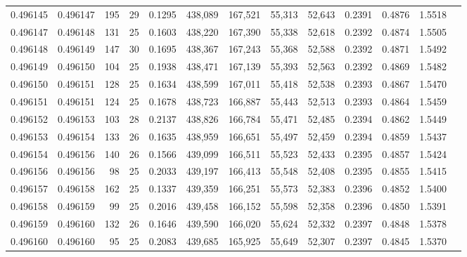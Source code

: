 \begin{tabular}{rrrrrrrrrrrrr}
0.496145 & 0.496147 & 195 &  29 &                                     0.1295 & 438,089 & 167,521 &  55,313 &  52,643 & 0.2391 & 0.4876 & 1.5518 \\
0.496147 & 0.496148 & 131 &  25 &                                     0.1603 & 438,220 & 167,390 &  55,338 &  52,618 & 0.2392 & 0.4874 & 1.5505 \\
0.496148 & 0.496149 & 147 &  30 &                                     0.1695 & 438,367 & 167,243 &  55,368 &  52,588 & 0.2392 & 0.4871 & 1.5492 \\
0.496149 & 0.496150 & 104 &  25 &                                     0.1938 & 438,471 & 167,139 &  55,393 &  52,563 & 0.2392 & 0.4869 & 1.5482 \\
0.496150 & 0.496151 & 128 &  25 &                                     0.1634 & 438,599 & 167,011 &  55,418 &  52,538 & 0.2393 & 0.4867 & 1.5470 \\
0.496151 & 0.496151 & 124 &  25 &                                     0.1678 & 438,723 & 166,887 &  55,443 &  52,513 & 0.2393 & 0.4864 & 1.5459 \\
0.496152 & 0.496153 & 103 &  28 &                                     0.2137 & 438,826 & 166,784 &  55,471 &  52,485 & 0.2394 & 0.4862 & 1.5449 \\
0.496153 & 0.496154 & 133 &  26 &                                     0.1635 & 438,959 & 166,651 &  55,497 &  52,459 & 0.2394 & 0.4859 & 1.5437 \\
0.496154 & 0.496156 & 140 &  26 &                                     0.1566 & 439,099 & 166,511 &  55,523 &  52,433 & 0.2395 & 0.4857 & 1.5424 \\
0.496156 & 0.496156 &  98 &  25 &                                     0.2033 & 439,197 & 166,413 &  55,548 &  52,408 & 0.2395 & 0.4855 & 1.5415 \\
0.496157 & 0.496158 & 162 &  25 &                                     0.1337 & 439,359 & 166,251 &  55,573 &  52,383 & 0.2396 & 0.4852 & 1.5400 \\
0.496158 & 0.496159 &  99 &  25 &                                     0.2016 & 439,458 & 166,152 &  55,598 &  52,358 & 0.2396 & 0.4850 & 1.5391 \\
0.496159 & 0.496160 & 132 &  26 &                                     0.1646 & 439,590 & 166,020 &  55,624 &  52,332 & 0.2397 & 0.4848 & 1.5378 \\
0.496160 & 0.496160 &  95 &  25 &                                     0.2083 & 439,685 & 165,925 &  55,649 &  52,307 & 0.2397 & 0.4845 & 1.5370 \\

\end{tabular}
